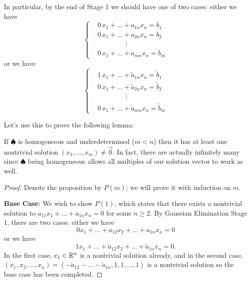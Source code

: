 \documentclass[main.tex]{subfiles}
\begin{document}
In particular, by the end of Stage 1 we should have one of two cases: either we have
\[\left\{\begin{aligned}
    &\boxed{0}\,x_1 + \ldots + a_{1n}x_n = b_1 \\
    &\boxed{0}\,x_1 + \ldots + a_{2n}x_n = b_2 \\
    &\phantom{hello guys}\vdots \\
    &\boxed{0}\,x_1 + \ldots + a_{mn}x_n = b_m
\end{aligned}\right.\]
or we have
\[\left\{\begin{aligned}
    &\boxed{1}\,x_1 + \ldots + \tilde{a}_{1n}x_n = \tilde{b}_1 \\
    &\boxed{0}\,x_1 + \ldots + \tilde{a}_{2n}x_n = \tilde{b}_2 \\
    &\phantom{hello guys}\vdots \\
    &\boxed{0}\,x_1 + \ldots + \tilde{a}_{mn}x_n = \tilde{b}_m
\end{aligned}\right.\]

Let's use this to prove the following lemma:

\begin{lemma}
    If $\spadesuit$ is homogeneous and underdetermined ($m < n$) then it has at least one nontrivial solution $(x_1, \ldots , x_m) \neq \vec{0}$. In fact, there are actually infinitely many since $\spadesuit$ being homogeneous allows all multiples of our solution vector to work as well.
\end{lemma}

\begin{proof}
    Denote the proposition by $P(m)$; we will prove it with induction on $m$.

    \textbf{Base Case}: We wish to show $P(1)$, which states that there exists a nontrivial solution to $a_{11}x_1 + \ldots + a_{1n}x_n = 0$ for some $n\ge 2$. By Gaussian Elimination Stage 1, there are two cases: either we have
    \[0x_1 + \ldots + a_{12}x_2 + \ldots + a_{1n}x_n = 0\]
    or we have
    \[1x_1 + \ldots + \tilde{a}_{12}x_2 + \ldots + \tilde{a}_{1n}x_n = 0.\]
    In the first case, $e_1\in \mathbb R^n$ is a nontrivial solution already, and in the second case, $(x_1, x_2, \ldots , x_n) = (-\tilde{a}_{12} - \ldots - \tilde{a}_{1n}, 1, 1, \ldots , 1)$ is a nontrivial solution so the base case has been completed.
\end{proof}
\end{document}

